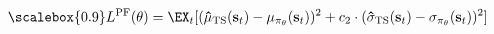 \begin{equation}
\scalebox{0.9}
     L^{\textrm{PF}}(\theta) = \EX_{t}[(\mathbf{\hat{\mu}}_{\mathrm{TS}}(\textbf{s}_t) - \mathbf{\mu}_{\pi_{\theta}}(\textbf{s}_t))^2 + c_2\cdot(\mathbf{\hat{\sigma}}_{\mathrm{TS}}(\textbf{s}_t) - \mathbf{\sigma}_{\pi_{\theta}}(\textbf{s}_t))^2]
\label{eq:l_tpo}
\end{equation}